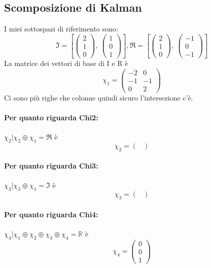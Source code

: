 \documentclass{article}
\begin{document}
\subsection{Scomposizione di Kalman}
I miei sottospazi di riferimento sono:	\[ \mathfrak{I} = \left[ \left(\begin{matrix}2\\1\\0\end{matrix}\right), \  \left(\begin{matrix}1\\0\\1\end{matrix}\right)\right], \mathfrak{R} = \left[ \left(\begin{matrix}2\\1\\0\end{matrix}\right), \  \left(\begin{matrix}-1\\0\\-1\end{matrix}\right)\right] \]
La matrice dei vettori di base di I e R è \[ \chi_1 =  \left(\begin{matrix}-2 & 0\\-1 & -1\\0 & 2\end{matrix}\right) \]
Ci sono più righe che colonne quindi sicuro l'intersezione c'è.

\paragraph{Per quanto riguarda Chi2:} $ \chi_2 | \chi_2 \oplus \chi_1 = \mathfrak{R} $ è \[ \chi_2 = \left(\begin{matrix}\end{matrix}\right) \]

\paragraph{Per quanto riguarda Chi3:} $ \chi_3 | \chi_3 \oplus \chi_1 = \mathfrak{I} $ è \[ \chi_3 = \left(\begin{matrix}\end{matrix}\right) \]

\paragraph{Per quanto riguarda Chi4:} $ \chi_4 | \chi_1 \oplus \chi_2 \oplus  \chi_3 \oplus \chi_4 = \mathbb{R} $ è \[ \chi_4 = \left(\begin{matrix}0\\0\\1\end{matrix}\right) \]
\end{document}

